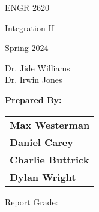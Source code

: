 \documentclass[12pt]{report}
\begin{document}
\begin{titlepage}
    
    \centering
    
    \Large{ENGR 2620}
    
    \Large{Integration II}
    
    \Large{Spring 2024}

    \vspace{0.5cm}
    
    \Huge \textsc{\TITLENAME}

    \vfill
    
    \vspace{1cm}
    
    \large{Dr. Jide Williams} \\
    \large{Dr. Irwin Jones}
    
    \vspace{0.8cm}

    \large \textbf{Prepared By:}
    \hspace{1.3cm} \begin{tabular}[t]{@{}l@{}}
        \textbf{Max Westerman}\\
        \textbf{Daniel Carey}\\
        \textbf{Charlie Buttrick}\\
        \textbf{Dylan Wright}\\
    \end{tabular}
    \vspace{10pt}
    
    \vfill
    \hfill \large Report Grade: \underline{\hspace{4cm}}
        
\end{titlepage}
\end{document}
